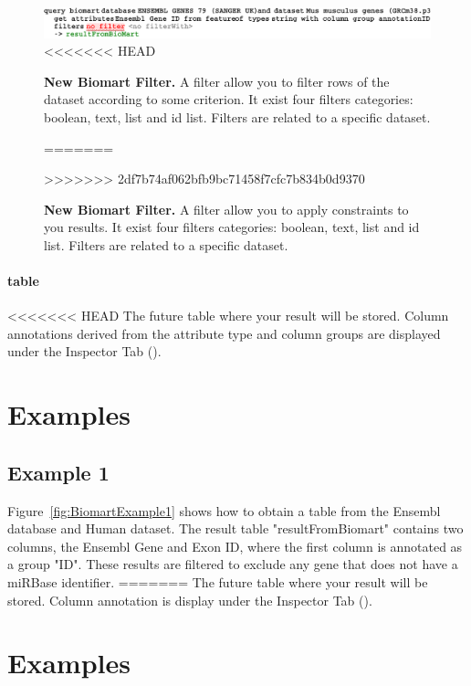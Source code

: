 \begin{itemize}
\begin{remark}
\begin{itemize}
 \begin{figure}[h!tbp]
  \centering
  \includegraphics[width=\figWidthWide]{figures/BiomartFilter.pdf}
<<<<<<< HEAD
\caption[New Biomart Filter]{\textbf{New Biomart Filter.} A filter allow you to filter rows of the dataset according to some criterion. It exist four filters categories: boolean, text, list and id list. Filters are related to a specific dataset.}
=======
\caption[New Biomart Filter]{\textbf{New Biomart Filter.} A filter allow you to apply constraints to you results. It exist four filters categories: boolean, text, list and id list. Filters are related to a specific dataset.}
>>>>>>> 2df7b74af062bfb9bc71458f7cfc7b834b0d9370
\label{fig:BiomartFilter}
\end{figure}

\paragraph{table}
<<<<<<< HEAD
The future table where your result will be stored. Column annotations derived from the attribute type and column groups are displayed under the Inspector Tab (\inspectorTabIcon).
\section{Examples}
\subsection{Example 1}
Figure~\ref{fig:BiomartExample1} shows how to obtain a table from the Ensembl database and Human dataset. The result table "resultFromBiomart" contains two columns, the Ensembl Gene and Exon ID, where the first column is annotated as a group "ID". These results are filtered to exclude any gene that does not have a miRBase identifier.
=======
The future table where your result will be stored. Column annotation is display under the Inspector Tab (\inspectorTabIcon).
\section{Examples}

\end{itemize}
\end{remark}
\end{itemize}
